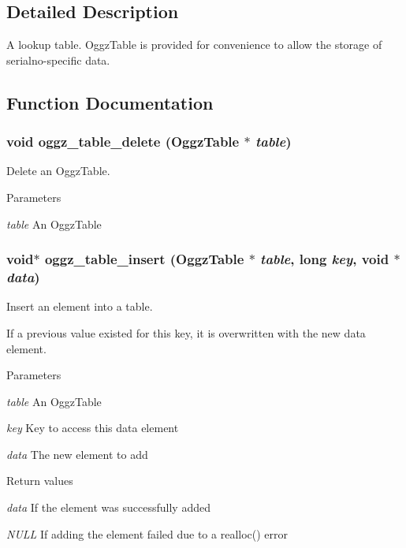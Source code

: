 \subsection{Detailed Description}
A lookup table. OggzTable is provided for convenience to allow the storage of serialno-\/specific data. 

\subsection{Function Documentation}
\subsubsection[{oggz\_\-table\_\-delete}]{\setlength{\rightskip}{0pt plus 5cm}void oggz\_\-table\_\-delete ({\bf OggzTable} $\ast$ {\em table})}\label{oggz__table_8h_a989e307feecf2adc2ebe905c067051c4}


Delete an OggzTable. 


\begin{DoxyParams}{Parameters}
\item[{\em table}]An OggzTable \end{DoxyParams}
\subsubsection[{oggz\_\-table\_\-insert}]{\setlength{\rightskip}{0pt plus 5cm}void$\ast$ oggz\_\-table\_\-insert ({\bf OggzTable} $\ast$ {\em table}, \/  long {\em key}, \/  void $\ast$ {\em data})}\label{oggz__table_8h_adbcdb0cdf6e8392c78956e911cbf6634}


Insert an element into a table. 

If a previous value existed for this key, it is overwritten with the new data element. 
\begin{DoxyParams}{Parameters}
\item[{\em table}]An OggzTable \item[{\em key}]Key to access this data element \item[{\em data}]The new element to add \end{DoxyParams}

\begin{DoxyRetVals}{Return values}
\item[{\em data}]If the element was successfully added \item[{\em NULL}]If adding the element failed due to a realloc() error \end{DoxyRetVals}
